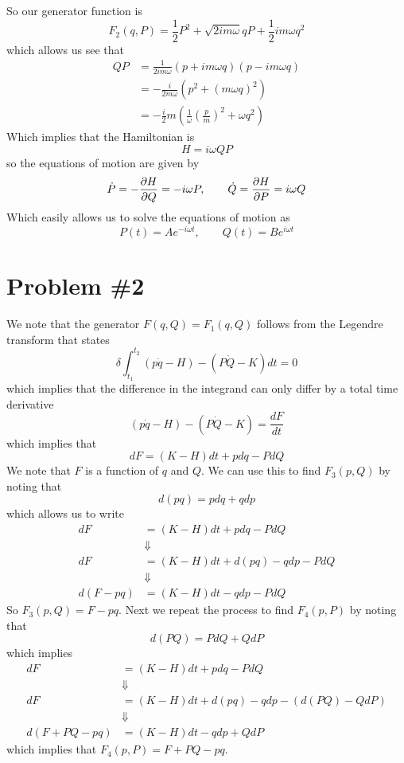 \documentclass[11pt]{article}
\numberwithin{equation}{section}
\begin{document}
So our generator function is
$$F_2(q,P) = \frac{1}{2}P^2 +\sqrt{2im\omega}{q}P + \frac{1}{2}im\omega{q^2}$$
which allows us see that
\begin{align*}
QP &= \frac{1}{2im\omega}(p+im\omega{q})(p-im\omega{q})\\
&= -\frac{i}{2m\omega}(p^2+(m\omega{q})^2)\\
&= -\frac{i}{2}m\left(\frac{1}{\omega}\left(\frac{p}{m}\right)^2+\omega{q}^2\right)
\end{align*}
Which implies that the Hamiltonian is 
$$H = i\omega{QP}$$
so the equations of motion are given by
$$\dot{P} = -\frac{\partial{H}}{\partial{Q}} = -i\omega{P},\qquad \dot{Q} = \frac{\partial{H}}{\partial{P}} = i\omega{Q}$$
Which easily allows us to solve the equations of motion as
$$P(t) = Ae^{-i\omega{t}},\qquad Q(t) = Be^{i\omega{t}}$$

\pagebreak

\section{Problem \#2}
We note that the generator $F(q,Q) = F_1(q,Q)$ follows from the Legendre transform that states
$$\delta\int_{t_1}^{t_2}(p\dot{q}-H)-(P\dot{Q}-K)dt = 0$$
which implies that the difference in the integrand can only differ by a total time derivative
$$(p\dot{q}-H)-(P\dot{Q}-K) = \frac{dF}{dt}$$
which implies that 
$$dF = (K-H)dt + pdq - PdQ$$
We note that $F$ is a function of $q$ and $Q$. We can use this to find $F_3(p,Q)$ by noting
that
$$d(pq) = pdq + qdp$$
which allows us to write
\begin{align*}
dF &= (K-H)dt + pdq - PdQ\\
&\Downarrow\\
dF &= (K-H)dt + d(pq) - qdp - PdQ\\
&\Downarrow\\
d(F-pq) &= (K-H)dt - qdp - PdQ
\end{align*}
So $F_3(p,Q) = F-pq$. Next we repeat the process to find $F_4(p,P)$ by noting that
$$d(PQ) = PdQ + QdP$$
which implies
\begin{align*}
dF &= (K-H)dt + pdq - PdQ\\
&\Downarrow\\
dF &= (K-H)dt + d(pq) - qdp - (d(PQ) - QdP)\\
&\Downarrow\\
d(F+PQ-pq) &= (K-H)dt - qdp + QdP
\end{align*}
which implies that $F_4(p,P) = F+PQ-pq$.

\pagebreak
\end{document}

